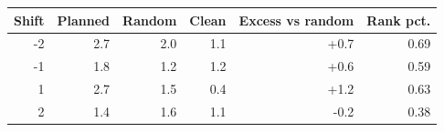 \begin{tabular}{rrrrrr}
\toprule
Shift & Planned & Random & Clean & Excess vs random & Rank pct. \\
\midrule
-2 & 2.7 & 2.0 & 1.1 & +0.7 & 0.69 \\
-1 & 1.8 & 1.2 & 1.2 & +0.6 & 0.59 \\
1 & 2.7 & 1.5 & 0.4 & +1.2 & 0.63 \\
2 & 1.4 & 1.6 & 1.1 & -0.2 & 0.38 \\
\bottomrule
\end{tabular}
